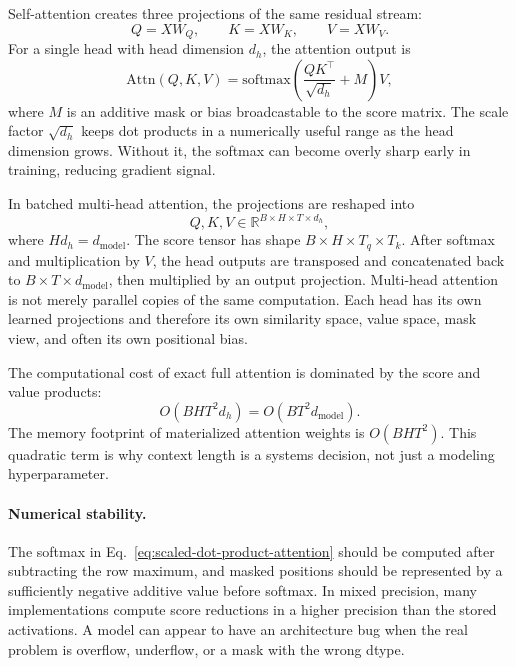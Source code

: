 Self-attention creates three projections of the same residual stream:
\begin{equation}
  Q = XW_Q,\qquad K = XW_K,\qquad V = XW_V.
\end{equation}
For a single head with head dimension $d_h$, the attention output is
\begin{equation}
  \mathrm{Attn}(Q,K,V)
  = \mathrm{softmax}(\frac{QK^{\top}}{\sqrt{d_h}} + M)V,
  \label{eq:scaled-dot-product-attention}
\end{equation}
where $M$ is an additive mask or bias broadcastable to the score matrix. The scale factor $\sqrt{d_h}$ keeps dot products in a numerically useful range as the head dimension grows. Without it, the softmax can become overly sharp early in training, reducing gradient signal.

In batched multi-head attention, the projections are reshaped into
\begin{equation}
  Q,K,V \in \mathbb{R}^{B \times H \times T \times d_h},
\end{equation}
where $H d_h = d_{\mathrm{model}}$. The score tensor has shape $B \times H \times T_q \times T_k$. After softmax and multiplication by $V$, the head outputs are transposed and concatenated back to $B \times T \times d_{\mathrm{model}}$, then multiplied by an output projection. Multi-head attention is not merely parallel copies of the same computation. Each head has its own learned projections and therefore its own similarity space, value space, mask view, and often its own positional bias.

The computational cost of exact full attention is dominated by the score and value products:
\begin{equation}
  O(BHT^2d_h) = O(BT^2d_{\mathrm{model}}).
\end{equation}
The memory footprint of materialized attention weights is $O(BHT^2)$. This quadratic term is why context length is a systems decision, not just a modeling hyperparameter.

\paragraph{Numerical stability.}
The softmax in Eq.~\ref{eq:scaled-dot-product-attention} should be computed after subtracting the row maximum, and masked positions should be represented by a sufficiently negative additive value before softmax. In mixed precision, many implementations compute score reductions in a higher precision than the stored activations. A model can appear to have an architecture bug when the real problem is overflow, underflow, or a mask with the wrong dtype.

